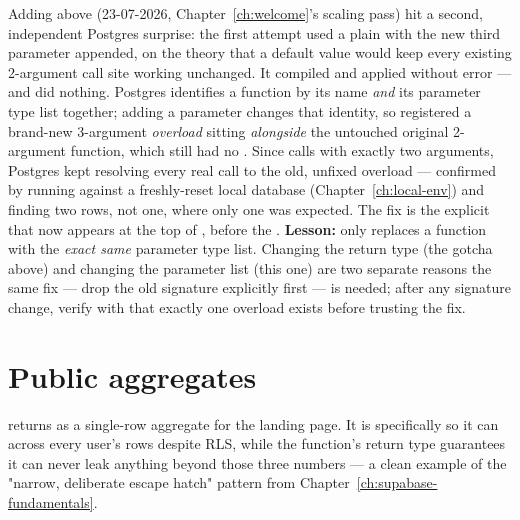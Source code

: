 \begin{olkgotcha}
Adding  above (23-07-2026, Chapter~\ref{ch:welcome}'s scaling pass) hit a second, independent Postgres surprise: the first attempt used a plain  with the new third parameter appended, on the theory that a default value would keep every existing 2-argument call site working unchanged. It compiled and applied without error — and did nothing. Postgres identifies a function by its name \emph{and} its parameter type list together; adding a parameter changes that identity, so  registered a brand-new 3-argument \emph{overload} sitting \emph{alongside} the untouched original 2-argument function, which still had no . Since  calls  with exactly two arguments, Postgres kept resolving every real call to the old, unfixed overload — confirmed by running  against a freshly-reset local database (Chapter~\ref{ch:local-env}) and finding two rows, not one, where only one was expected. The fix is the explicit  that now appears at the top of , before the . \textbf{Lesson:}  only replaces a function with the \emph{exact same} parameter type list. Changing the return type (the gotcha above) and changing the parameter list (this one) are two separate reasons the same fix — drop the old signature explicitly first — is needed; after any signature change, verify with  that exactly one overload exists before trusting the fix.
\end{olkgotcha}

\section{Public aggregates}

 returns  as a single-row aggregate for the landing page. It is  specifically so it can  across every user's rows despite RLS, while the function's return type guarantees it can never leak anything beyond those three numbers — a clean example of the "narrow, deliberate escape hatch" pattern from Chapter~\ref{ch:supabase-fundamentals}.


